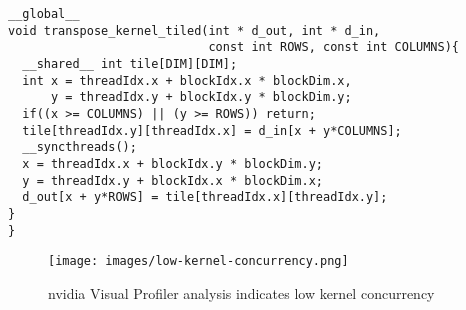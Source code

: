 \begin{lstlisting}[caption={Tiled transpose}, label={lst:transpose tiled}]
__global__
void transpose_kernel_tiled(int * d_out, int * d_in,
                            const int ROWS, const int COLUMNS){
  __shared__ int tile[DIM][DIM]; 
  int x = threadIdx.x + blockIdx.x * blockDim.x,
      y = threadIdx.y + blockIdx.y * blockDim.y;
  if((x >= COLUMNS) || (y >= ROWS)) return;
  tile[threadIdx.y][threadIdx.x] = d_in[x + y*COLUMNS];
  __syncthreads();
  x = threadIdx.x + blockIdx.y * blockDim.y;
  y = threadIdx.y + blockIdx.x * blockDim.x;
  d_out[x + y*ROWS] = tile[threadIdx.x][threadIdx.y];
}
}
\end{lstlisting}

\begin{figure}[htb]
  \centering
  \texttt{[image: images/low-kernel-concurrency.png]}
  \caption{nvidia Visual Profiler analysis indicates low kernel concurrency}
  \label{fig:first impl}
\end{figure}
